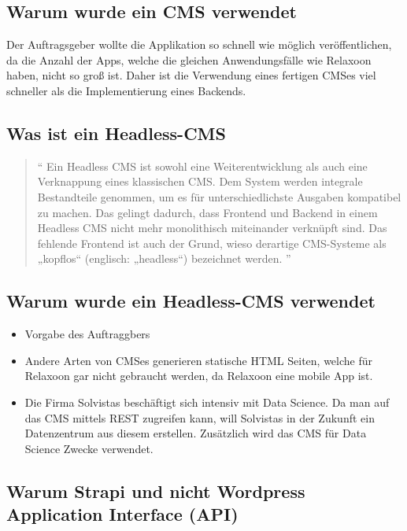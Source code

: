 \begin{spacing}{1}
    \subsection{Warum wurde ein CMS verwendet}
    Der Auftragsgeber wollte die Applikation so schnell wie möglich veröffentlichen,
    da die Anzahl der Apps, welche die gleichen Anwendungsfälle wie Relaxoon haben,
    nicht so groß ist.
    Daher ist die Verwendung eines fertigen CMSes viel schneller als
    die Implementierung eines Backends.

    \subsection{Was ist ein Headless-CMS}
    \begin{quotation}

        ``
        Ein Headless CMS ist sowohl eine Weiterentwicklung als
        auch eine Verknappung eines klassischen CMS. Dem System
        werden integrale Bestandteile genommen, um es für
        unterschiedlichste Ausgaben kompatibel zu machen.
        Das gelingt dadurch, dass Frontend und Backend in einem
        Headless CMS nicht mehr monolithisch miteinander verknüpft
        sind. Das fehlende Frontend ist auch der Grund,
        wieso derartige CMS-Systeme als
        „kopflos“ (englisch: „headless“) bezeichnet werden.
        '' \cite{headles-cms}
    \end{quotation}

    \subsection{Warum wurde ein Headless-CMS verwendet}
    \begin{itemize}
        \item Vorgabe des Auftraggbers
        \item Andere Arten von CMSes generieren statische HTML Seiten, welche für Relaxoon gar nicht gebraucht werden,
              da Relaxoon eine mobile App ist.
        \item Die Firma Solvistas beschäftigt sich intensiv mit Data Science. Da man auf das CMS mittels REST zugreifen kann,
              will Solvistas in der Zukunft ein Datenzentrum aus diesem erstellen. 
              Zusätzlich wird das CMS für Data Science Zwecke verwendet.
    \end{itemize}
    \subsection{Warum Strapi und nicht Wordpress \textbf{Ap}plication \textbf{I}nterface (API)}




\end{spacing}
